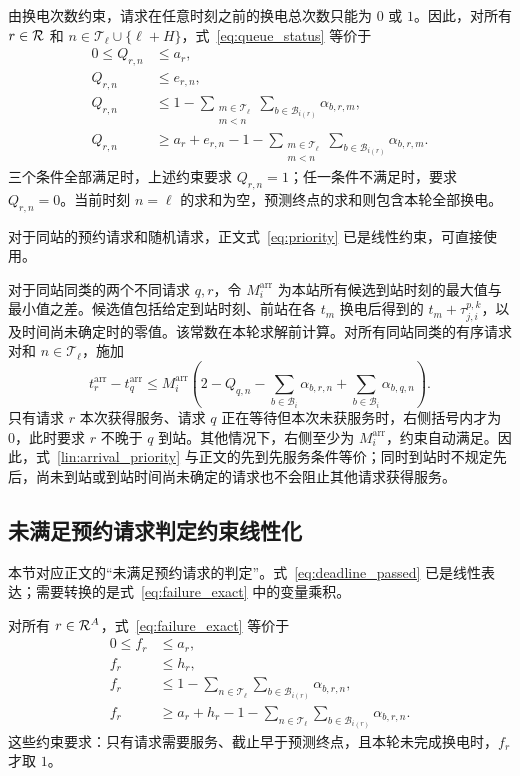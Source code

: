 由换电次数约束，请求在任意时刻之前的换电总次数只能为 $0$ 或 $1$。因此，对所有 $r\in\mathcal R$ 和 $n\in\mathcal T_\ell\cup\{\ell+H\}$，式~\eqref{eq:queue_status} 等价于
\begin{equation}
\begin{aligned}
0\le Q_{r,n}&\le a_r,\\
Q_{r,n}&\le e_{r,n},\\
Q_{r,n}&\le1-
\sum_{\substack{m\in\mathcal T_\ell\\m<n}}
\sum_{b\in\mathcal B_{i(r)}}\alpha_{b,r,m},\\
Q_{r,n}&\ge a_r+e_{r,n}-1-
\sum_{\substack{m\in\mathcal T_\ell\\m<n}}
\sum_{b\in\mathcal B_{i(r)}}\alpha_{b,r,m}.
\end{aligned}
\label{lin:queue_status}
\end{equation}
三个条件全部满足时，上述约束要求 $Q_{r,n}=1$；任一条件不满足时，要求 $Q_{r,n}=0$。当前时刻 $n=\ell$ 的求和为空，预测终点的求和则包含本轮全部换电。

对于同站的预约请求和随机请求，正文式~\eqref{eq:priority} 已是线性约束，可直接使用。

对于同站同类的两个不同请求 $q,r$，令 $M_i^{\mathrm{arr}}$ 为本站所有候选到站时刻的最大值与最小值之差。候选值包括给定到站时刻、前站在各 $t_m$ 换电后得到的 $t_m+\tau_{j,i}^{p,k}$，以及时间尚未确定时的零值。该常数在本轮求解前计算。对所有同站同类的有序请求对和 $n\in\mathcal T_\ell$，施加
\begin{equation}
t_r^{\mathrm{arr}}-t_q^{\mathrm{arr}}
\le M_i^{\mathrm{arr}}\left(
2-Q_{q,n}
-\sum_{b\in\mathcal B_i}\alpha_{b,r,n}
+\sum_{b\in\mathcal B_i}\alpha_{b,q,n}
\right).
\label{lin:arrival_priority}
\end{equation}
只有请求 $r$ 本次获得服务、请求 $q$ 正在等待但本次未获服务时，右侧括号内才为 $0$，此时要求 $r$ 不晚于 $q$ 到站。其他情况下，右侧至少为 $M_i^{\mathrm{arr}}$，约束自动满足。因此，式~\eqref{lin:arrival_priority} 与正文的先到先服务条件等价；同时到站时不规定先后，尚未到站或到站时间尚未确定的请求也不会阻止其他请求获得服务。

\subsection{未满足预约请求判定约束线性化}
\label{lin:unmet_requests_section}
本节对应正文的“未满足预约请求的判定”。式~\eqref{eq:deadline_passed} 已是线性表达；需要转换的是式~\eqref{eq:failure_exact} 中的变量乘积。

对所有 $r\in\mathcal R^A$，式~\eqref{eq:failure_exact} 等价于
\begin{equation}
\begin{aligned}
0\le f_r&\le a_r,\\
f_r&\le h_r,\\
f_r&\le1-\sum_{n\in\mathcal T_\ell}
\sum_{b\in\mathcal B_{i(r)}}\alpha_{b,r,n},\\
f_r&\ge a_r+h_r-1-\sum_{n\in\mathcal T_\ell}
\sum_{b\in\mathcal B_{i(r)}}\alpha_{b,r,n}.
\end{aligned}
\label{lin:unmet_reservation}
\end{equation}
这些约束要求：只有请求需要服务、截止早于预测终点，且本轮未完成换电时，$f_r$ 才取 $1$。

